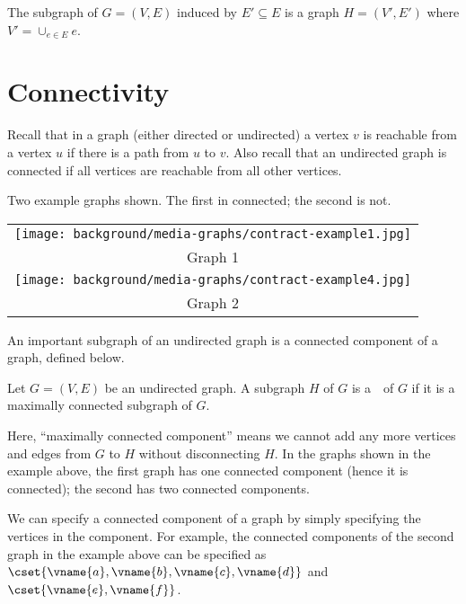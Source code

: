 \begin{definition}
\label{def:bg::graphs::subgraph::ei}
The subgraph of $G = (V,E)$ induced by $E' \subseteq E$ is a graph $H
= (V',E')$ where $V' = \cup_{e \in E} e$.
\end{definition}

\section{Connectivity}
\label{sec:bg::graphs::connectivity}

\begin{gram}
Recall that in a graph (either directed or undirected) a vertex $v$ is
reachable from a vertex $u$ if there is a path from $u$ to $v$.  Also
recall that an undirected graph is connected if all vertices are
reachable from all other vertices. 
\end{gram}

\begin{example}
\label{ex:gc-two-graphs}
Two example graphs shown. The first in connected; the second is not.

\begin{tabular}{c}
\texttt{[image: background/media-graphs/contract-example1.jpg]}
\\
{Graph 1}
\\
\texttt{[image: background/media-graphs/contract-example4.jpg]}
\\
{Graph 2}
\end{tabular}

An important subgraph of an undirected graph is a connected component
of a graph, defined below.
\end{example}

\begin{definition}
\label{def:bg::graphs::cc}
Let $G = (V,E)$ be an undirected graph.  A subgraph $H$ of $G$ is
a~~of $G$ if it is a maximally connected
subgraph of $G$.
\end{definition}

\begin{gram}
Here, ``maximally connected component'' means we cannot add any more
vertices and edges from $G$ to $H$ without disconnecting $H$. In the
graphs shown in the example above, the first graph has one connected
component (hence it is connected); the second has two connected
components.
%
\end{gram}

\begin{note}
We can specify a connected component of a graph by simply specifying the
vertices in the component.
%
For example, the connected components of the second graph in the
example above can be specified as
%
$\cset{\vname{a},\vname{b},\vname{c},\vname{d}}$
%
and 
%
$\cset{\vname{e},\vname{f}}$.
\end{note}

